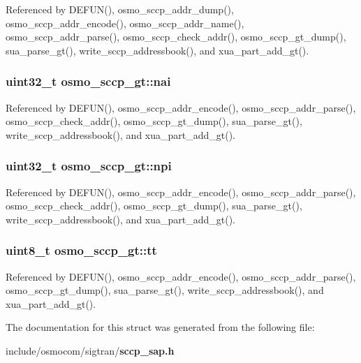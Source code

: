 Referenced by D\+E\+F\+U\+N(), osmo\+\_\+sccp\+\_\+addr\+\_\+dump(), osmo\+\_\+sccp\+\_\+addr\+\_\+encode(), osmo\+\_\+sccp\+\_\+addr\+\_\+name(), osmo\+\_\+sccp\+\_\+addr\+\_\+parse(), osmo\+\_\+sccp\+\_\+check\+\_\+addr(), osmo\+\_\+sccp\+\_\+gt\+\_\+dump(), sua\+\_\+parse\+\_\+gt(), write\+\_\+sccp\+\_\+addressbook(), and xua\+\_\+part\+\_\+add\+\_\+gt().

\subsubsection[{nai}]{\setlength{\rightskip}{0pt plus 5cm}uint32\+\_\+t osmo\+\_\+sccp\+\_\+gt\+::nai}\label{structosmo__sccp__gt_a3d7aaff6d2058351094db70729d07344}


Referenced by D\+E\+F\+U\+N(), osmo\+\_\+sccp\+\_\+addr\+\_\+encode(), osmo\+\_\+sccp\+\_\+addr\+\_\+parse(), osmo\+\_\+sccp\+\_\+check\+\_\+addr(), osmo\+\_\+sccp\+\_\+gt\+\_\+dump(), sua\+\_\+parse\+\_\+gt(), write\+\_\+sccp\+\_\+addressbook(), and xua\+\_\+part\+\_\+add\+\_\+gt().

\subsubsection[{npi}]{\setlength{\rightskip}{0pt plus 5cm}uint32\+\_\+t osmo\+\_\+sccp\+\_\+gt\+::npi}\label{structosmo__sccp__gt_a530106080a18196622c9324dc1b0ad9d}


Referenced by D\+E\+F\+U\+N(), osmo\+\_\+sccp\+\_\+addr\+\_\+encode(), osmo\+\_\+sccp\+\_\+addr\+\_\+parse(), osmo\+\_\+sccp\+\_\+check\+\_\+addr(), osmo\+\_\+sccp\+\_\+gt\+\_\+dump(), sua\+\_\+parse\+\_\+gt(), write\+\_\+sccp\+\_\+addressbook(), and xua\+\_\+part\+\_\+add\+\_\+gt().

\subsubsection[{tt}]{\setlength{\rightskip}{0pt plus 5cm}uint8\+\_\+t osmo\+\_\+sccp\+\_\+gt\+::tt}\label{structosmo__sccp__gt_aed1b40905e70d510dd438469b724eb25}


Referenced by D\+E\+F\+U\+N(), osmo\+\_\+sccp\+\_\+addr\+\_\+encode(), osmo\+\_\+sccp\+\_\+addr\+\_\+parse(), osmo\+\_\+sccp\+\_\+gt\+\_\+dump(), sua\+\_\+parse\+\_\+gt(), write\+\_\+sccp\+\_\+addressbook(), and xua\+\_\+part\+\_\+add\+\_\+gt().



The documentation for this struct was generated from the following file\+:\begin{DoxyCompactItemize}
\item 
include/osmocom/sigtran/{\bf sccp\+\_\+sap.\+h}\end{DoxyCompactItemize}
